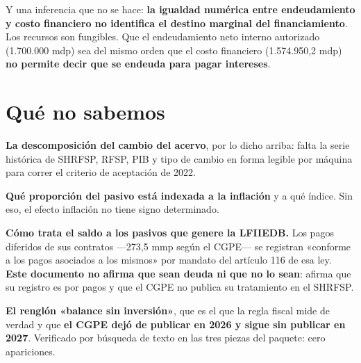 Y una inferencia que no se hace: \textbf{la igualdad numérica entre endeudamiento y costo
financiero no identifica el destino marginal del financiamiento}. Los recursos son
fungibles. Que el endeudamiento neto interno autorizado (1.700.000 mdp) sea del mismo orden
que el costo financiero (1.574.950,2 mdp) \textbf{no permite decir que se endeuda para pagar
intereses}.

\section{Qué no sabemos}

\begin{list}{}{\setlength{\leftmargin}{1.4em}\setlength{\itemsep}{2pt}}
\item[$\bullet$] \textbf{La descomposición del cambio del acervo}, por lo dicho arriba: falta
la serie histórica de SHRFSP, RFSP, PIB y tipo de cambio en forma legible por máquina para
correr el criterio de aceptación de 2022.
\item[$\bullet$] \textbf{Qué proporción del pasivo está indexada a la inflación} y a qué
índice. Sin eso, el efecto inflación no tiene signo determinado.
\item[$\bullet$] \textbf{Cómo trata el saldo a los pasivos que genere la LFIIEDB.} Los pagos
diferidos de sus contratos ---273,5 mmp según el CGPE--- se registran «conforme a los pagos
asociados a los mismos» por mandato del artículo 116 de esa ley. \textbf{Este documento no
afirma que sean deuda ni que no lo sean}: afirma que su registro es por pagos y que el CGPE
no publica su tratamiento en el SHRFSP.
\item[$\bullet$] \textbf{El renglón «balance sin inversión»}, que es el que la regla fiscal
mide de verdad y que \textbf{el CGPE dejó de publicar en 2026 y sigue sin publicar en
2027}. Verificado por búsqueda de texto en las tres piezas del paquete: cero apariciones.
\end{list}

